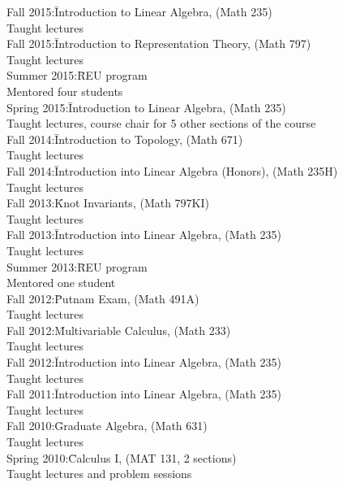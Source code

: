 \documentclass[11pt]{amsart}
\theoremstyle{plain}
\theoremstyle{definition}
\theoremstyle{remark}
\begin{document}
\begin{tabbing}
Fall 2015:\quad\quad\quad\= Introduction to Linear Algebra, (Math 235)\\
\>Taught lectures \\


Fall 2015:\quad\quad\quad\= Introduction to Representation Theory, (Math 797)\\
\>Taught lectures \\

Summer 2015:\quad\= REU program\\
\>Mentored four students \\

Spring 2015:\quad\quad\= Introduction to Linear Algebra, (Math 235)\\
\>Taught lectures, course chair for 5 other sections of the course\\


Fall 2014:\quad\quad\quad\= Introduction to Topology, (Math 671)\\
\>Taught lectures \\


Fall 2014:\quad\quad\quad\= Introduction into Linear Algebra (Honors), (Math 235H)\\
\>Taught lectures \\



Fall 2013:\quad\quad\quad\= Knot Invariants, (Math 797KI)\\
\>Taught lectures \\


Fall 2013:\quad\quad\quad\= Introduction into Linear Algebra, (Math 235)\\
\>Taught lectures \\


Summer 2013:\quad\= REU program\\
\>Mentored one student \\


Fall 2012:\quad\quad\quad\= Putnam Exam, (Math 491A)\\
\>Taught lectures \\

Fall 2012:\quad\quad\quad\= Multivariable Calculus, (Math 233)\\
\>Taught lectures \\

Fall 2012:\quad\quad\quad\= Introduction into Linear Algebra, (Math 235)\\
\>Taught lectures \\

Fall 2011:\quad\quad\quad\= Introduction into Linear Algebra, (Math 235)\\
\>Taught lectures \\
Fall 2010:\quad\quad\quad\= Graduate Algebra, (Math 631)\\
\>Taught lectures \\
Spring 2010:\quad\quad\= Calculus I, (MAT 131, 2 sections)\\
 \>Taught lectures and problem sessions\\
\end{tabbing}
\end{document}
